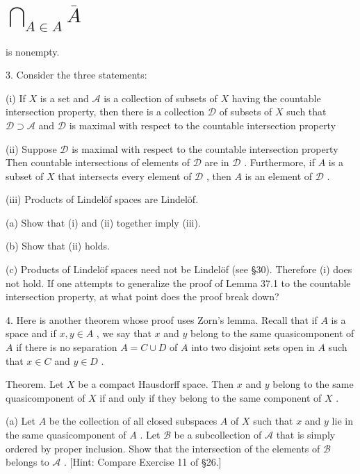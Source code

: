 \section*{\(\mathop{\bigcap }\limits_{{A \in  A}}\bar{A}\)}

is nonempty.

3. Consider the three statements:

(i) If \(X\) is a set and \(\mathcal{A}\) is a collection of subsets of \(X\) having the countable intersection property, then there is a collection \(\mathcal{D}\) of subsets of \(X\) such that \(\mathcal{D} \supset  \mathcal{A}\) and \(\mathcal{D}\) is maximal with respect to the countable intersection property

(ii) Suppose \(\mathcal{D}\) is maximal with respect to the countable intersection property Then countable intersections of elements of \(\mathcal{D}\) are in \(\mathcal{D}\) . Furthermore, if \(A\) is a subset of \(X\) that intersects every element of \(\mathcal{D}\) , then \(A\) is an element of \(\mathcal{D}\) .

(iii) Products of Lindelöf spaces are Lindelöf.

(a) Show that (i) and (ii) together imply (iii).

(b) Show that (ii) holds.

(c) Products of Lindelöf spaces need not be Lindelöf (see §30). Therefore (i) does not hold. If one attempts to generalize the proof of Lemma 37.1 to the countable intersection property, at what point does the proof break down?

4. Here is another theorem whose proof uses Zorn’s lemma. Recall that if \(A\) is a space and if \(x,y \in  A\) , we say that \(x\) and \(y\) belong to the same quasicomponent of \(A\) if there is no separation \(A = C \cup  D\) of \(A\) into two disjoint sets open in \(A\) such that \(x \in  C\) and \(y \in  D\) .

Theorem. Let \(X\) be a compact Hausdorff space. Then \(x\) and \(y\) belong to the same quasicomponent of \(X\) if and only if they belong to the same component of \(X\) .

(a) Let \(A\) be the collection of all closed subspaces \(A\) of \(X\) such that \(x\) and \(y\) lie in the same quasicomponent of \(A\) . Let \(\mathcal{B}\) be a subcollection of \(\mathcal{A}\) that is simply ordered by proper inclusion. Show that the intersection of the elements of \(\mathcal{B}\) belongs to \(\mathcal{A}\) . [Hint: Compare Exercise 11 of §26.]

